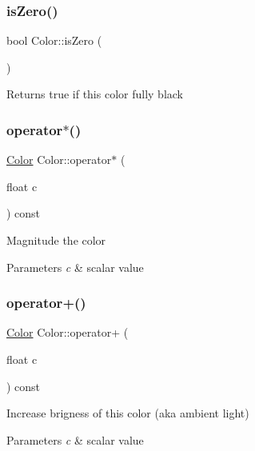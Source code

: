 \subsubsection{\texorpdfstring{is\+Zero()}{isZero()}}
{\footnotesize\ttfamily bool Color\+::is\+Zero (\begin{DoxyParamCaption}{ }\end{DoxyParamCaption})\hspace{0.3cm}{\ttfamily [inline]}}

\begin{DoxyReturn}{Returns}
true if this color fully black 
\end{DoxyReturn}
\mbox{\label{class_color_ad752bd0184c61b0afd86fe11f1472633}} 
\subsubsection{\texorpdfstring{operator$\ast$()}{operator*()}}
{\footnotesize\ttfamily \mbox{\hyperlink{class_color}{Color}} Color\+::operator$\ast$ (\begin{DoxyParamCaption}\item[{float}]{c }\end{DoxyParamCaption}) const\hspace{0.3cm}{\ttfamily [inline]}}

Magnitude the color 
\begin{DoxyParams}{Parameters}
{\em c} & scalar value \\
\hline
\end{DoxyParams}
\mbox{\label{class_color_a7937d45e05eacfa19174171743f612c6}} 
\subsubsection{\texorpdfstring{operator+()}{operator+()}}
{\footnotesize\ttfamily \mbox{\hyperlink{class_color}{Color}} Color\+::operator+ (\begin{DoxyParamCaption}\item[{float}]{c }\end{DoxyParamCaption}) const\hspace{0.3cm}{\ttfamily [inline]}}

Increase brigness of this color (aka ambient light) 
\begin{DoxyParams}{Parameters}
{\em c} & scalar value \\
\hline
\end{DoxyParams}
\mbox{\label{class_color_acf63f968ca0decdd119164e206807693}} 
